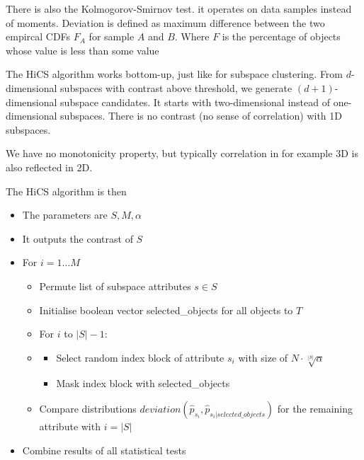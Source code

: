     There is also the Kolmogorov-Smirnov test. it operates on data samples instead of moments. Deviation is defined as maximum difference between the two empircal CDFs $F_A$ for sample $A$ and $B$.
    Where $F$ is the percentage of objects whose value is less than some value

    The HiCS algorithm works bottom-up, just like for subspace clustering. From $d$-dimensional subspaces with contrast above threshold, we generate $(d+1)$-dimensional subspace candidates. It starts with two-dimensional instead of one-dimensional subspaces. There is no contrast (no sense of correlation) with 1D subspaces.
    
    We have no monotonicity property, but typically correlation in for example 3D is also reflected in 2D.
    
    The HiCS algorithm is then
    \begin{itemize}
        \item The parameters are $S, M, \alpha$
        \item It outputs the contrast of $S$
        \item For $i = 1 \dots M$
        \begin{itemize}
            \item Permute list of subspace attributes $s \in S$
            \item Initialise boolean vector selected\_objects for all objects to $T$
            \item For $i$ to $|S| - 1$:
            \item \begin{itemize}
                \item Select random index block of attribute $s_i$ with size of $N \cdot \sqrt[|S|]{\alpha}$
                \item Mask index block with selected\_objects
            \end{itemize}
            \item Compare distributions $deviation(\hat{p}_{s_i}, \hat{p}_{s_i | selected\_objects})$ for the remaining attribute with $i = |S|$
        \end{itemize}
        \item Combine results of all statistical tests
    \end{itemize}
    
